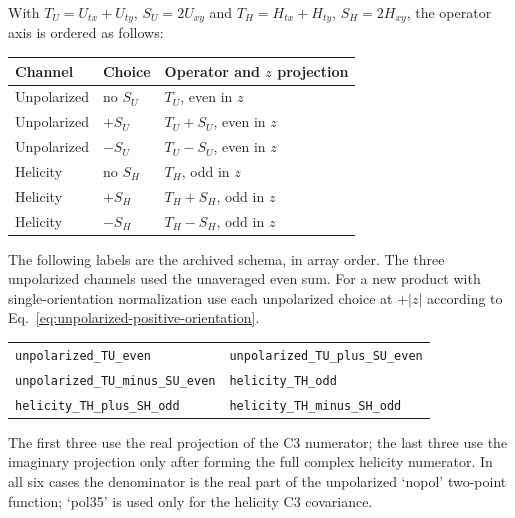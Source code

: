 \documentclass[11pt]{article}
\numberwithin{equation}{section}
\begin{document}
With $T_U=U_{tx}+U_{ty}$, $S_U=2U_{xy}$ and
$T_H=H_{tx}+H_{ty}$, $S_H=2H_{xy}$, the operator axis is ordered as follows:
\begin{center}
\begin{tabular}{p{}p{}p{}}
\toprule
Channel & Choice & Operator and $z$ projection\\
\midrule
Unpolarized & no $S_U$ & $T_U$, even in $z$\\
Unpolarized & $+S_U$ & $T_U+S_U$, even in $z$\\
Unpolarized & $-S_U$ & $T_U-S_U$, even in $z$\\
Helicity & no $S_H$ & $T_H$, odd in $z$\\
Helicity & $+S_H$ & $T_H+S_H$, odd in $z$\\
Helicity & $-S_H$ & $T_H-S_H$, odd in $z$\\
\bottomrule
\end{tabular}
\end{center}
The following labels are the archived schema, in array order.  The three
unpolarized channels used the unaveraged even sum.  For a new product with
single-orientation normalization use each unpolarized choice at \(+|z|\)
according to Eq.~\eqref{eq:unpolarized-positive-orientation}.
\begin{center}
\begin{tabular}{p{}p{}}
\texttt{unpolarized\_TU\_even} &
\texttt{unpolarized\_TU\_plus\_SU\_even}\\
\texttt{unpolarized\_TU\_minus\_SU\_even} &
\texttt{helicity\_TH\_odd}\\
\texttt{helicity\_TH\_plus\_SH\_odd} &
\texttt{helicity\_TH\_minus\_SH\_odd}
\end{tabular}
\end{center}
The first three use the real
projection of the C3 numerator; the last three use the imaginary projection
only after forming the full complex helicity numerator.  In all six cases the
denominator is the real part of the unpolarized `nopol' two-point function;
`pol35' is used only for the helicity C3 covariance.
\end{document}
